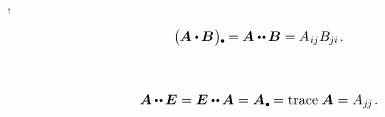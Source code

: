 

\vspace{-0.2em}
,

\nopagebreak\vspace{-0.3em}
\begin{equation}\label{tensoralgebra.contractiondotrepeated}
\bigl( \hspace{-0.1ex} \bm{A} \dotp \hspace{-0.1ex} \bm{B} \hspace{.1ex} \bigr)\tracedot
= \hspace{-0.1ex} \bm{A} \dotdotp \hspace{-0.1ex} \bm{B}
= \hspace{-0.1ex} A_{\hspace{.1ex}i\hspace{-0.1ex}j} B_{\hspace{-0.1ex}j\hspace{-0.06ex}i}
\hspace{.2ex} .
\end{equation}

\noindent
{}
~

\nopagebreak\vspace{-0.4em}
\begin{equation}\label{doubledotwiththeunitdyad.istrace}
\bm{A} \hspace{-0.1ex} \dotdotp \hspace{-0.1ex} \UnitDyad
= \UnitDyad \dotdotp \hspace{-0.1ex} \bm{A}
= \bm{A}\hspace{.15ex}\tracedot
= \trace{\bm{A}}
= A_{j\hspace{-0.15ex}j}
\hspace{.2ex} .
\end{equation}

